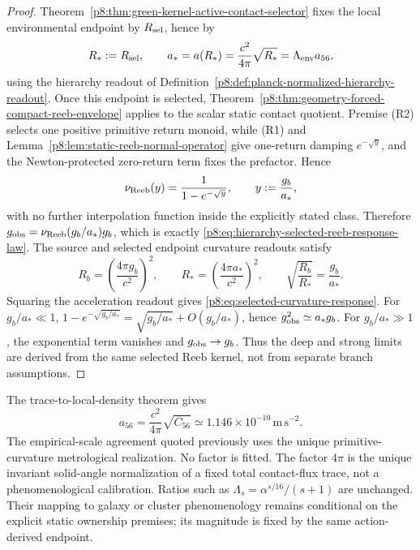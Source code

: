 \documentclass[12pt,a4paper]{article}
\begin{document}
\begin{proof}
Theorem~\ref{p8:thm:green-kernel-active-contact-selector} fixes the local environmental endpoint by \(R_{\rm sel}\), hence by
\[
R_*:=R_{\rm sel},
\qquad
    a_* = a(R_*)=\frac{c^2}{4\pi}\sqrt{R_*}=\Lambda_{\rm env}a_{56},
\]
using the hierarchy readout of Definition~\ref{p8:def:planck-normalized-hierarchy-readout}.  Once this endpoint is selected, Theorem~\ref{p8:thm:geometry-forced-compact-reeb-envelope} applies to the scalar static contact quotient.  Premise (R2) selects one positive primitive return monoid, while (R1) and Lemma~\ref{p8:lem:static-reeb-normal-operator} give one-return damping \(e^{-\sqrt y}\), and the Newton-protected zero-return term fixes the prefactor.  Hence
\[
\nu_{\rm Reeb}(y)=\frac{1}{1-e^{-\sqrt y}},
\qquad
    y:=\frac{g_b}{a_*},
\]
with no further interpolation function inside the explicitly stated class.  Therefore \(g_{\rm obs}=\nu_{\rm Reeb}(g_b/a_*)g_b\), which is exactly \eqref{p8:eq:hierarchy-selected-reeb-response-law}.  The source and selected endpoint curvature readouts satisfy
\[
R_b=\left(\frac{4\pi g_b}{c^2}\right)^2,
\qquad
R_*=\left(\frac{4\pi a_*}{c^2}\right)^2,
\qquad
\sqrt{\frac{R_b}{R_*}}=\frac{g_b}{a_*}.
\]
Squaring the acceleration readout gives \eqref{p8:eq:selected-curvature-response}.  For \(g_b/a_*\ll1\), \(1-e^{-\sqrt{g_b/a_*}}=\sqrt{g_b/a_*}+O(g_b/a_*)\), hence \(g_{\rm obs}^2\simeq a_*g_b\).  For \(g_b/a_*\gg1\), the exponential term vanishes and \(g_{\rm obs}\to g_b\).  Thus the deep and strong limits are derived from the same selected Reeb kernel, not from separate branch assumptions.
\end{proof}

\begin{remark}
\label{p8:rem:hierarchy-reeb-data-status}
The trace-to-local-density theorem gives
\[
a_{56}=\frac{c^2}{4\pi}\sqrt{C_{56}}
\simeq1.146\times10^{-10}\,\mathrm{m\,s^{-2}}.
\]
The empirical-scale agreement quoted previously uses the unique primitive-curvature metrological realization.  No factor is fitted.  The factor
\(4\pi\) is the unique invariant solid-angle normalization of a fixed total
contact-flux trace, not a phenomenological calibration.  Ratios such as
$\Lambda_s=\alpha^{s/16}/(s+1)$ are unchanged.  Their mapping to galaxy or
cluster phenomenology remains conditional on the explicit static ownership
premises; its magnitude is fixed by the same action-derived endpoint.
\end{remark}
\end{document}
